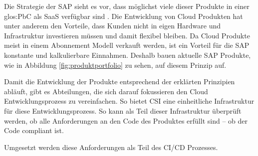 \documentclass[../main.tex]{subfiles}
\begin{document}
Die Strategie der SAP sieht es vor, dass möglichst viele dieser Produkte in einer \gls{glos:PbC} als \gls{SaaS} verfügbar sind \cite{SAPCloudStrategy}.
Die Entwicklung von Cloud Produkten hat unter anderem den Vorteile, dass Kunden nicht in eigen Hardware und Infrastruktur investieren müssen und damit flexibel bleiben.
Da Cloud Produkte meist in einem Abonnement Modell verkauft werden, ist ein Vorteil für die SAP konstante und kalkulierbare Einnahmen.
Deshalb bauen aktuelle SAP Produkte, wie in Abbildung \ref{fig:produktportfolio} zu sehen, auf diesem Prinzip auf.
\cite{CloudProContra}

Damit die Entwicklung der Produkte entsprechend der erklärten Prinzipien abläuft, gibt es Abteilungen, die sich darauf fokussieren den Cloud Entwicklungsprozess zu vereinfachen.
So bietet \gls{CSI} eine einheitliche Infrastruktur für diese Entwicklungsprozess.
So kann als Teil dieser Infrastruktur überprüft werden, ob alle Anforderungen an den Code des Produktes erfüllt sind -- ob der Code compliant ist.

Umgesetzt werden diese Anforderungen als Teil des \gls{CI/CD} Prozesses.
\end{document}
